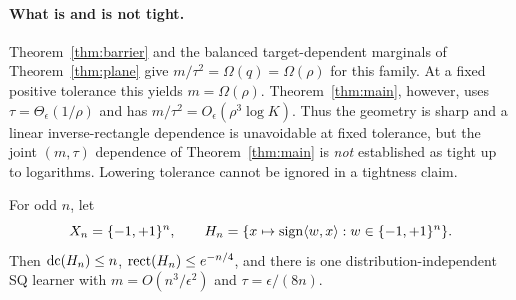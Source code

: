 \paragraph{What is and is not tight.}
Theorem~\ref{thm:barrier} and the balanced target-dependent marginals of Theorem~\ref{thm:plane} give $m/\tau^2=\Omega(q)=\Omega(\rho)$ for this family. At a fixed positive tolerance this yields $m=\Omega(\rho)$. Theorem~\ref{thm:main}, however, uses $\tau=\Theta_\epsilon(1/\rho)$ and has $m/\tau^2=O_\epsilon(\rho^3\log K)$. Thus the geometry is sharp and a linear inverse-rectangle dependence is unavoidable at fixed tolerance, but the joint $(m,\tau)$ dependence of Theorem~\ref{thm:main} is \emph{not} established as tight up to logarithms. Lowering tolerance cannot be ignored in a tightness claim.

\begin{samepage}
\begin{theorem}\label{thm:halfspaces}
For odd $n$, let
\[
 X_n=\{-1,+1\}^n,\qquad
 H_n=\{x\mapsto\operatorname{sign}\langle w,x\rangle:w\in\{-1,+1\}^n\}.
\]
Then $\operatorname{dc}(H_n)\le n$, $\operatorname{rect}(H_n)\le e^{-n/4}$, and there is one distribution-independent SQ learner with $m=O(n^3/\epsilon^2)$ and $\tau=\epsilon/(8n)$.
\end{theorem}
\end{samepage}
